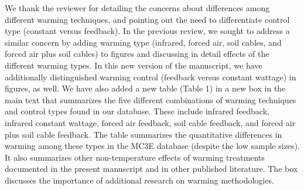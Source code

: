 \documentclass[11pt,a4paper]{letter}
\begin{document}
\begin{letter}{}
\begin{enumerate}
\begin{enumerate}
\par We thank the reviewer for detailing the concerns about differences among different warming techniques, and pointing out the need to differentiate control type (constant versus feedback). In the previous review, we sought to address a similar concern by adding warming type (infrared, forced air, soil cables, and forced air plus soil cables) to figures and discussing in detail effects of the different warming types. In this new version of the manuscript, we have additionally distinguished warming control (feedback versus constant wattage) in figures, as well. We have also added a new table (Table 1) in a new box in the main text that summarizes the five different combinations of warming techniques and control types found in our database. These include infrared feedback, infrared constant wattage, forced air feedback, soil cable feedback, and forced air plus soil cable feedback. The table summarizes the quantitative differences in warming among these types in the MC3E database (despite the low sample sizes).  It also summarizes other non-temperature effects of warming treatments documented in the present manuscript and in other published literature. The box discusses the importance of additional research on warming methodologies. 


\end{enumerate}
\end{enumerate}
\end{letter}
\end{document}
